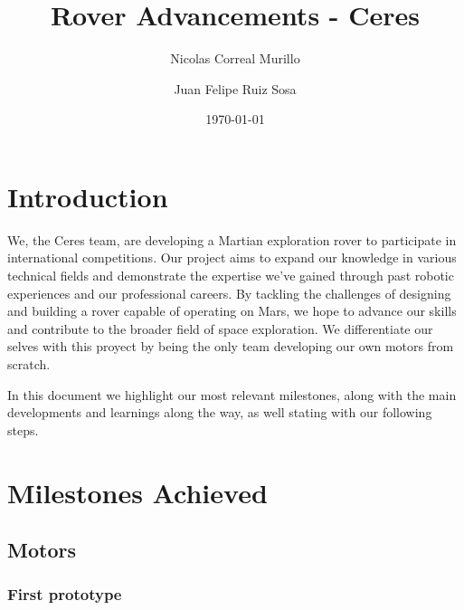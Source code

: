 \documentclass{article}
\title{Rover Advancements - Ceres}
\author{Nicolas Correal Murillo \and Juan Felipe Ruiz Sosa}
\date{\today}
\begin{document}
\maketitle

\section*{Introduction}
We, the Ceres team, are developing a Martian exploration rover to participate in international competitions.
Our project aims to expand our knowledge in various technical fields and demonstrate the expertise we've gained
 through past robotic experiences and our professional careers. By tackling the challenges of designing and 
 building a rover capable of operating on Mars, we hope to advance our skills and contribute to the broader 
 field of space exploration. We differentiate our selves with this proyect by being the only team developing our own motors from scratch.


In this document we highlight our most relevant milestones, along with the main developments and learnings along the way, as well stating with our following steps.

\tableofcontents

\section{Milestones Achieved}
 \subsection{Motors}

 \subsubsection{First prototype}
\end{document}
